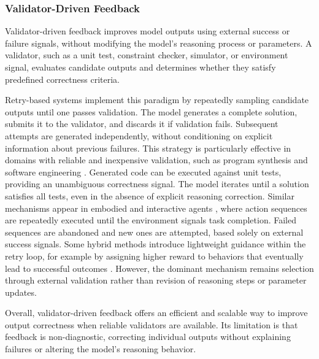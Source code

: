 \subsubsection{Validator-Driven Feedback}

Validator-driven feedback improves model outputs using external success or failure signals, without modifying the model’s reasoning process or parameters. A validator, such as a unit test, constraint checker, simulator, or environment signal, evaluates candidate outputs and determines whether they satisfy predefined correctness criteria.

Retry-based systems \cite{dao2025rezero,potamitis2025retrials} implement this paradigm by repeatedly sampling candidate outputs until one passes validation. The model generates a complete solution, submits it to the validator, and discards it if validation fails. Subsequent attempts are generated independently, without conditioning on explicit information about previous failures. This strategy is particularly effective in domains with reliable and inexpensive validation, such as program synthesis and software engineering \cite{le2022coderl,ni2023lever,swebench}. Generated code can be executed against unit tests, providing an unambiguous correctness signal. The model iterates until a solution satisfies all tests, even in the absence of explicit reasoning correction. Similar mechanisms appear in embodied and interactive agents \cite{ahn2022icanisay,driess2023palm}, where action sequences are repeatedly executed until the environment signals task completion. Failed sequences are abandoned and new ones are attempted, based solely on external success signals. Some hybrid methods introduce lightweight guidance within the retry loop, for example by assigning higher reward to behaviors that eventually lead to successful outcomes \cite{bensal2025reflect}. However, the dominant mechanism remains selection through external validation rather than revision of reasoning steps or parameter updates.

Overall, validator-driven feedback offers an efficient and scalable way to improve output correctness when reliable validators are available. Its limitation is that feedback is non-diagnostic, correcting individual outputs without explaining failures or altering the model’s reasoning behavior.

